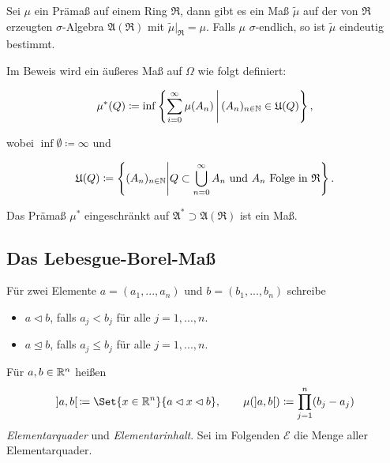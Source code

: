 \documentclass{cheat-sheet}
\newcommand{\Alg}{\mathfrak{A}}
\newcommand{\Ring}{\mathfrak{R}}
\begin{document}
\begin{satz}
  Sei $\mu$ ein Prämaß auf einem Ring $\Ring$, dann gibt es ein Maß $\tilde{\mu}$ auf der von $\Ring$ erzeugten $\sigma$-Algebra $\Alg(\Ring)$ mit $\tilde{\mu}|_\Ring = \mu$. Falls $\mu$ $\sigma$-endlich, so ist $\tilde{\mu}$ eindeutig bestimmt.
\end{satz}

\begin{samepage} %

\begin{bem}
  Im Beweis wird ein äußeres Maß auf $\Omega$ wie folgt definiert:

  \[ \mu^*(Q) \coloneqq \inf \left\{ \sum_{i = 0}^\infty \mu(A_n) \,\middle|\, (A_n)_{n \in \mathbb{N}} \in \mathfrak{U}(Q) \right\}, \]

  wobei $\inf \emptyset \coloneqq \infty$ und

  \[ \mathfrak{U}(Q) \coloneqq \left\{ (A_n)_{n \in \N} \middle| Q \subset \bigcup_{n = 0}^\infty A_n \text{ und } A_n \text{ Folge in } \Ring \right\}. \]

  Das Prämaß $\mu^*$ eingeschränkt auf $\Alg^* \supset \Alg(\Ring)$ ist ein Maß.
\end{bem}

\subsection{Das Lebesgue-Borel-Maß}

\end{samepage}

\begin{nota}
  Für zwei Elemente $a = (a_1, ..., a_n)$ und $b = (b_1, ..., b_n)$ schreibe
  \begin{itemize}
    \item $a \lhd b$, falls $a_j < b_j$ für alle $j = 1, ..., n$.
    \item $a \unlhd b$, falls $a_j \leq b_j$ für alle $j = 1, ..., n$.
  \end{itemize}
\end{nota}

\begin{defn}
  Für $a, b \in \mathbb{R}^n$ heißen
  \[
    ]a, b[\,\coloneqq \Set{ x \in \R^n }{ a \lhd x \lhd b }, \qquad
    \mu(]a, b[) \coloneqq \prod_{j = 1}^{n} (b_j - a_j)
  \]
  \emph{Elementarquader} und \emph{Elementarinhalt}. Sei im Folgenden $\mathcal{E}$ die Menge aller Elementarquader.
\end{defn}
\end{document}
